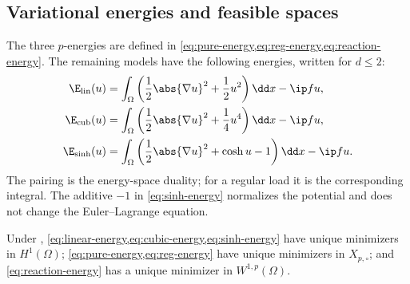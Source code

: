 \subsection{Variational energies and feasible spaces}
\label{sec:models}

The three \(p\)-energies are defined in \cref{eq:pure-energy,eq:reg-energy,eq:reaction-energy}. The
remaining models have the following energies, written for \(d\leq2\):
\begin{align}
 \E_{\rm lin}(u)&=\int_\Omega\left(\frac12\abs{\nabla u}^2+
 \frac12u^2\right)\dd x-\ip fu,
 \label{eq:linear-energy}\\
 \E_{\rm cub}(u)&=\int_\Omega\left(\frac12\abs{\nabla u}^2+
 \frac14u^4\right)\dd x-\ip fu,
 \label{eq:cubic-energy}\\
 \E_{\sinh}(u)&=\int_\Omega\left(\frac12\abs{\nabla u}^2+
 \cosh u-1\right)\dd x-\ip fu.
 \label{eq:sinh-energy}
\end{align}
The pairing is the energy-space duality; for a regular load it is the corresponding integral.
The additive \(-1\) in \cref{eq:sinh-energy} normalizes the
potential and does not change the Euler--Lagrange equation.


\begin{proposition}
\label{prop:wellposedness}
Under , \cref{eq:linear-energy,eq:cubic-energy,eq:sinh-energy} have unique minimizers
in \(H^1(\Omega)\); \cref{eq:pure-energy,eq:reg-energy} have unique minimizers in \(X_{p,\circ}\); and
\cref{eq:reaction-energy} has a unique minimizer in \(W^{1,p}(\Omega)\).
\end{proposition}

